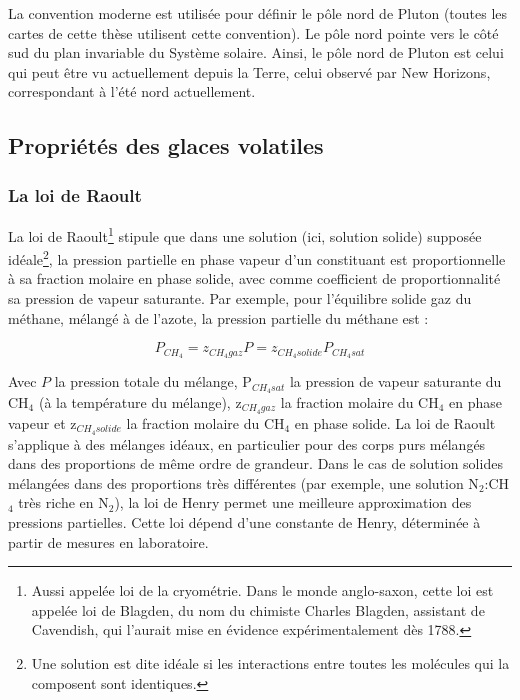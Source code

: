 La convention moderne est utilisée pour définir le pôle nord de Pluton (toutes les cartes de cette thèse utilisent cette convention). Le pôle nord pointe vers le côté sud du plan invariable du Système solaire. Ainsi, le pôle nord de Pluton est celui qui peut être vu actuellement depuis la Terre, celui observé par New Horizons, correspondant à l’été nord actuellement. 

\subsection{Propriétés des glaces volatiles}
\label{sc:glaces}

\subsubsection{La loi de Raoult}

La loi de Raoult\footnote{Aussi appelée loi de la cryométrie. Dans le monde anglo-saxon, cette loi est appelée loi de Blagden, du nom du chimiste Charles Blagden, assistant de Cavendish, qui l'aurait mise en évidence expérimentalement dès 1788.} stipule que dans une solution (ici, solution solide) supposée idéale\footnote{Une solution est dite idéale si les interactions entre toutes les molécules qui la composent sont identiques.}, la pression partielle en phase vapeur d'un constituant est proportionnelle à sa fraction molaire en phase solide, avec comme coefficient de proportionnalité sa pression de vapeur saturante. Par exemple, pour l’équilibre solide gaz du méthane, mélangé à de l’azote, la pression partielle du méthane est :

\begin{equation}
P_{CH_4} = z_{CH_4 gaz} P = z_{CH_4 solide} P_{CH_4 sat}     
\end{equation}

Avec $P$ la pression totale du mélange, P$_{CH_4 sat}$ la pression de vapeur saturante du CH$_4$ (à la température du mélange), z$_{CH_4 gaz}$ la fraction molaire du CH$_4$ en phase vapeur et z$_{CH_4 solide}$ la fraction molaire du CH$_4$ en phase solide. 
La loi de Raoult s’applique à des mélanges idéaux, en particulier pour des corps purs mélangés dans des proportions de même ordre de grandeur. Dans le cas de solution solides mélangées dans des proportions très différentes (par exemple, une solution N$_2$:CH$_4$ très riche en N$_2$), la loi de Henry permet une meilleure approximation des pressions partielles. Cette loi dépend d’une constante de Henry, déterminée à partir de mesures en laboratoire. 

